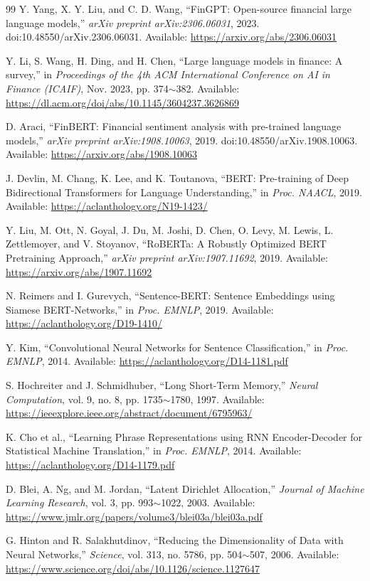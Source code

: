 \documentclass[journal]{IEEEtran}
\newcommand{\rng}{\ensuremath{\sim}}
\begin{document}
\begin{thebibliography}{99}
Y. Yang, X. Y. Liu, and C. D. Wang, ``FinGPT: Open-source financial large language models,'' \textit{arXiv preprint arXiv:2306.06031}, 2023. doi:10.48550/arXiv.2306.06031. Available: \url{https://arxiv.org/abs/2306.06031}

Y. Li, S. Wang, H. Ding, and H. Chen, ``Large language models in finance: A survey,'' in \textit{Proceedings of the 4th ACM International Conference on AI in Finance (ICAIF)}, Nov. 2023, pp. 374\rng{}382. Available: \url{https://dl.acm.org/doi/abs/10.1145/3604237.3626869}

D. Araci, ``FinBERT: Financial sentiment analysis with pre-trained language models,'' \textit{arXiv preprint arXiv:1908.10063}, 2019. doi:10.48550/arXiv.1908.10063. Available: \url{https://arxiv.org/abs/1908.10063}

J. Devlin, M. Chang, K. Lee, and K. Toutanova, ``BERT: Pre-training of Deep Bidirectional Transformers for Language Understanding,'' in \textit{Proc. NAACL}, 2019. Available: \url{https://aclanthology.org/N19-1423/}

Y. Liu, M. Ott, N. Goyal, J. Du, M. Joshi, D. Chen, O. Levy, M. Lewis, L. Zettlemoyer, and V. Stoyanov, ``RoBERTa: A Robustly Optimized BERT Pretraining Approach,'' \textit{arXiv preprint arXiv:1907.11692}, 2019. Available: \url{https://arxiv.org/abs/1907.11692}

N. Reimers and I. Gurevych, ``Sentence-BERT: Sentence Embeddings using Siamese BERT-Networks,'' in \textit{Proc. EMNLP}, 2019. Available: \url{https://aclanthology.org/D19-1410/}

Y. Kim, ``Convolutional Neural Networks for Sentence Classification,'' in \textit{Proc. EMNLP}, 2014. Available: \url{https://aclanthology.org/D14-1181.pdf}

S. Hochreiter and J. Schmidhuber, ``Long Short-Term Memory,'' \textit{Neural Computation}, vol. 9, no. 8, pp. 1735\rng{}1780, 1997. Available: \url{https://ieeexplore.ieee.org/abstract/document/6795963/}

K. Cho et al., ``Learning Phrase Representations using RNN Encoder-Decoder for Statistical Machine Translation,'' in \textit{Proc. EMNLP}, 2014. Available: \url{https://aclanthology.org/D14-1179.pdf}

D. Blei, A. Ng, and M. Jordan, ``Latent Dirichlet Allocation,'' \textit{Journal of Machine Learning Research}, vol. 3, pp. 993\rng{}1022, 2003. Available: \url{https://www.jmlr.org/papers/volume3/blei03a/blei03a.pdf}

G. Hinton and R. Salakhutdinov, ``Reducing the Dimensionality of Data with Neural Networks,'' \textit{Science}, vol. 313, no. 5786, pp. 504\rng{}507, 2006. Available: \url{https://www.science.org/doi/abs/10.1126/science.1127647}

\end{thebibliography}
\end{document}
